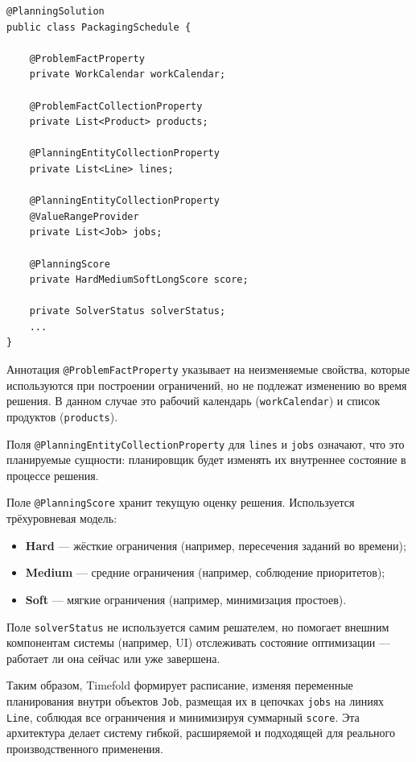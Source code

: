 \begin{lstlisting}[caption={Класс PackagingSchedule}, label={lst:classPackagingSchedule}]
@PlanningSolution
public class PackagingSchedule {

    @ProblemFactProperty
    private WorkCalendar workCalendar;

    @ProblemFactCollectionProperty
    private List<Product> products;

    @PlanningEntityCollectionProperty
    private List<Line> lines;

    @PlanningEntityCollectionProperty
    @ValueRangeProvider
    private List<Job> jobs;

    @PlanningScore
    private HardMediumSoftLongScore score;

    private SolverStatus solverStatus;
    ...
}
\end{lstlisting}

Аннотация \texttt{@ProblemFactProperty} указывает на неизменяемые свойства, которые используются при построении ограничений, но не подлежат изменению во время решения. В данном случае это рабочий календарь (\texttt{workCalendar}) и список продуктов (\texttt{products}).

Поля \texttt{@PlanningEntityCollectionProperty} для \texttt{lines} и \texttt{jobs} означают, что это планируемые сущности: планировщик будет изменять их внутреннее состояние в процессе решения.

Поле \texttt{@PlanningScore} хранит текущую оценку решения. Используется трёхуровневая модель:

\begin{itemize}
    \item \textbf{Hard} — жёсткие ограничения (например, пересечения заданий во времени);
    \item \textbf{Medium} — средние ограничения (например, соблюдение приоритетов);
    \item \textbf{Soft} — мягкие ограничения (например, минимизация простоев).
\end{itemize}

Поле \texttt{solverStatus} не используется самим решателем, но помогает внешним компонентам системы (например, UI) отслеживать состояние оптимизации — работает ли она сейчас или уже завершена.

\vspace{1em}

Таким образом, Timefold формирует расписание, изменяя переменные планирования внутри объектов \texttt{Job}, размещая их в цепочках \texttt{jobs} на линиях \texttt{Line}, соблюдая все ограничения и минимизируя суммарный \texttt{score}. Эта архитектура делает систему гибкой, расширяемой и подходящей для реального производственного применения.


